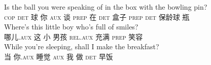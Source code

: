 \eal
\label{aux-fronting-childes}
\ex 
\gll Is the ball you were speaking of in the box with the bowling pin?\\
\textsc{cop} \textsc{det} 球 你 \textsc{aux} 谈 \textsc{prep} 在 \textsc{det} 盒子 \textsc{prep} \textsc{det} 保龄球 瓶\\
\ex 
\gll Where's this little boy who's full of smiles?\\
哪儿.\textsc{aux} 这 小 男孩 \textsc{rel}.\textsc{aux} 充满 \textsc{prep} 笑容\\
\ex\label{aux-fronting-Adjunktsatz} 
\gll While you're sleeping, shall I make the breakfast?\\
当 你.\textsc{aux} 睡觉 \textsc{aux} 我 做 \textsc{det} 早饭\\
\zl

